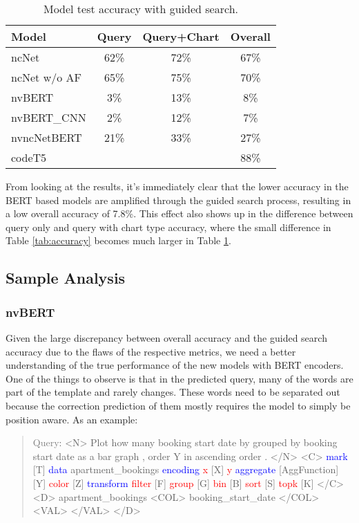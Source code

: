 \documentclass[
	a4paper, %
	10pt, %
	unnumberedsections, %
	twoside, %
]{t0003}
\newcommand{\blue}[1]{\textcolor{blue}{#1}}
\newcommand{\gray}[1]{\textcolor{gray}{#1}}
\newcommand{\red}[1]{\textcolor{red}{#1}}
\begin{document}
\begin{table} %
	\caption{Model test accuracy with guided search.}
	\centering
	\begin{tabular}{lccc}
		\toprule
		Model & Query & Query+Chart & Overall  \\
		\midrule
		ncNet & 62\% &72\% & 67\% \\
		ncNet w/o AF & 65\% & 75\% & 70\%  \\
		\hline
		nvBERT & 3\% & 13\% & 8\% \\
		nvBERT\_CNN &  2\% & 12\% & 7\% \\
		\hline
		nvncNetBERT & 21\% & 33\% & 27\% \\
		\hline
		codeT5 & & & 88\% \\
		\bottomrule
	\end{tabular}
	\label{tab:guidedaccuracy}
\end{table}

From looking at the results, it's immediately clear that the lower accuracy in the BERT based models are amplified through the guided search process, resulting in a low overall accuracy of 7.8\%. This effect also shows up in the difference between query only and query with chart type accuracy, where the small difference in Table \ref{tab:accuracy} becomes much larger in Table \ref{tab:guidedaccuracy}.

\subsection{Sample Analysis}

\subsubsection{nvBERT} Given the large discrepancy between overall accuracy and the guided search accuracy due to the flaws of the respective metrics, we need a better understanding of the true performance of the new models with BERT encoders. One of the things to observe is that in the predicted query, many of the words are part of the template and rarely changes. These words need to be separated out because the correction prediction of them mostly requires the model to simply be position aware. As an example:

\begin{quote}
\gray{Query}: <N> Plot how many booking start date by grouped by booking start date as a bar graph , order Y in ascending order . </N> <C> \blue{mark} [T] \blue{data} apartment\_bookings \blue{ encoding} \red{x} [X] \red{y} \blue{aggregate} [AggFunction] [Y] \red{color} [Z] \blue{transform} \red{filter} [F] \red{group} [G] \red{bin} [B] \red{sort} [S] \red{topk} [K] </C> <D> apartment\_bookings <COL> booking\_start\_date </COL> <VAL> </VAL> </D>
\end{quote}
\end{document}
